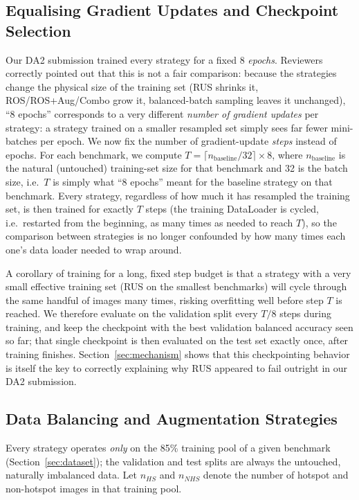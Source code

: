 \documentclass[conference]{IEEEtran}
\begin{document}
\subsection{Equalising Gradient Updates and Checkpoint Selection}
\label{sec:methodology-steps}
Our DA2 submission trained every strategy for a fixed 8 \emph{epochs}.
Reviewers correctly pointed out that this is not a fair comparison:
because the strategies change the physical size of the training set
(RUS shrinks it, ROS/ROS+Aug/Combo grow it, balanced-batch sampling
leaves it unchanged), ``8 epochs'' corresponds to a very different
\emph{number of gradient updates} per strategy: a strategy trained on
a smaller resampled set simply sees far fewer mini-batches per epoch.
We now fix the number of gradient-update \emph{steps} instead of
epochs. For each benchmark, we compute
$T = \lceil n_{\text{baseline}} / 32 \rceil \times 8$, where
$n_{\text{baseline}}$ is the natural (untouched) training-set size for
that benchmark and 32 is the batch size, i.e.\ $T$ is simply what
``8 epochs'' meant for the baseline strategy on that benchmark. Every
strategy, regardless of how much it has resampled the training set,
is then trained for exactly $T$ steps (the training DataLoader is
cycled, i.e.\ restarted from the beginning, as many times as needed to
reach $T$), so the comparison between strategies is no longer
confounded by how many times each one's data loader needed to wrap
around.

A corollary of training for a long, fixed step budget is that a
strategy with a very small effective training set (RUS on the smallest
benchmarks) will cycle through the same handful of images many times,
risking overfitting well before step $T$ is reached. We therefore
evaluate on the validation split every $T/8$ steps during training,
and keep the checkpoint with the best validation balanced accuracy
seen so far; that single checkpoint is then evaluated on the test set
exactly once, after training finishes. Section~\ref{sec:mechanism}
shows that this checkpointing behavior is itself the key to correctly
explaining why RUS appeared to fail outright in our DA2 submission.

\subsection{Data Balancing and Augmentation Strategies}
\label{sec:strategies}
Every strategy operates \emph{only} on the 85\% training pool of a
given benchmark (Section~\ref{sec:dataset}); the validation and test
splits are always the untouched, naturally imbalanced data. Let
$n_{HS}$ and $n_{NHS}$ denote the number of hotspot and non-hotspot
images in that training pool.
\end{document}
